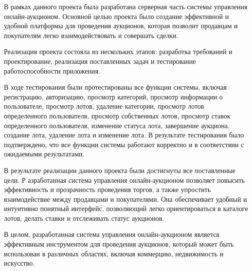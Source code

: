 


В рамках данного проекта была разработана серверная часть системы управления онлайн-аукционом. 
Основной целью проекта было создание эффективной и удобной платформы для проведения аукционов, 
которая позволит продавцам и покупателям легко взаимодействовать и совершать сделки.

Реализация проекта состояла из нескольких этапов: 
разработка требований и проектирование, реализация поставленных задач и тестирование работоспособности приложения.

В ходе тестирования были протестированы все функции системы, 
включая регистрацию, авторизацию, просмотр категорий, просмотр информации о пользователе, 
просмотр лотов, удаление категории, просмотр лотов определенного пользователя, просмотр собственных лотов, 
просмотр ставок определенного пользователя, изменение статуса лота, завершение аукциона, создание лота, удаление лота и изменение лота. 
В результате тестирования было подтверждено, что все функции системы работают корректно и в соответствии с ожидаемыми результатами.

В результате реализации данного проекта были достигнуты все поставленные цели. Р
азработанная система управления онлайн-аукционом позволяет повысить эффективность и прозрачность проведения торгов, 
а также упростить взаимодействие между продавцами и покупателями. Она обеспечивает удобный и интуитивно понятный интерфейс, 
позволяющий легко ориентироваться в каталоге лотов, делать ставки и отслеживать статус аукционов.

В целом, разработанная система управления онлайн-аукционом является эффективным инструментом для проведения аукционов, который может быть использован в различных областях, включая коммерцию, недвижимость и искусство.